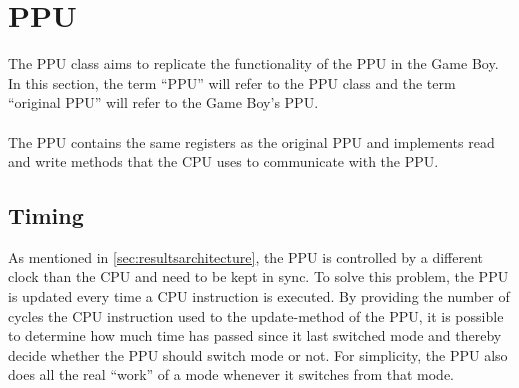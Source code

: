 
\section{PPU}
The PPU class aims to replicate the functionality of the PPU in the Game Boy. In this section, the term ``PPU'' will refer to the PPU class and the term ``original PPU'' will refer to the Game Boy's PPU.\\
\\
The PPU contains the same registers as the original PPU and implements read and write methods that the CPU uses to communicate with the PPU.

\subsection{Timing}
As mentioned in \ref{sec:resultsarchitecture}, the PPU is controlled by a different clock than the CPU and need to be kept in sync. To solve this problem, the PPU is updated every time a CPU instruction is executed. By providing the number of cycles the CPU instruction used to the update-method of the PPU, it is possible to determine how much time has passed since it last switched mode and thereby decide whether the PPU should switch mode or not. For simplicity, the PPU also does all the real ``work'' of a mode whenever it switches from that mode.

